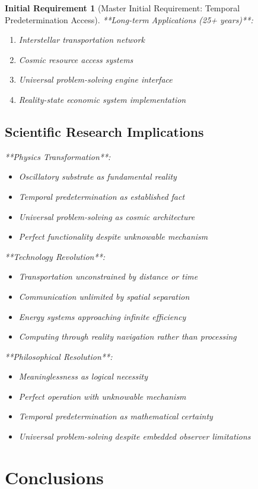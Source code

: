 \documentclass[12pt,a4paper]{article}
\newtheorem{requirement}[theorem]{Initial Requirement}
\theoremstyle{remark}
\begin{document}
\begin{requirement}[Master Initial Requirement: Temporal Predetermination Access]
**Long-term Applications (25+ years)**:
\begin{enumerate}
\item Interstellar transportation network
\item Cosmic resource access systems
\item Universal problem-solving engine interface
\item Reality-state economic system implementation
\end{enumerate}

\subsection{Scientific Research Implications}

**Physics Transformation**:
\begin{itemize}
\item Oscillatory substrate as fundamental reality
\item Temporal predetermination as established fact
\item Universal problem-solving as cosmic architecture
\item Perfect functionality despite unknowable mechanism
\end{itemize}

**Technology Revolution**:
\begin{itemize}
\item Transportation unconstrained by distance or time
\item Communication unlimited by spatial separation
\item Energy systems approaching infinite efficiency
\item Computing through reality navigation rather than processing
\end{itemize}

**Philosophical Resolution**:
\begin{itemize}
\item Meaninglessness as logical necessity
\item Perfect operation with unknowable mechanism
\item Temporal predetermination as mathematical certainty
\item Universal problem-solving despite embedded observer limitations
\end{itemize}

\section{Conclusions}


\end{requirement}
\end{document}
